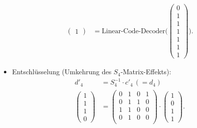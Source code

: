 \begin{itemize}
\begin{align*}
\begin{pmatrix}
                1
            \end{pmatrix}
            &=\text{Linear-Code-Decoder(}
            \begin{pmatrix}
                0\\
                1\\
                1\\
                1\\
                1\\
                1\\
                1
            \end{pmatrix}
            \text{)}
            .
        \end{align*}
    \item Entschlüsselung (Umkehrung des $S_4$-Matrix-Effekts):
        \begin{align*}
            d'_{4}&=S_{4}^{-1} \cdot c'_4 \,(= d_4)\\
            \begin{pmatrix}
                1\\
                1\\
                1\\
                0
            \end{pmatrix}
            &=
            \begin{pmatrix} %
                0 & 1 & 0 & 1\\
                0 & 1 & 1 & 0\\
                1 & 1 & 0 & 0\\
                0 & 1 & 0 & 0\\
            \end{pmatrix}
            \cdot
            \begin{pmatrix} %
                1\\
                0\\
                1\\
                1
            \end{pmatrix}
            .
        \end{align*}
\end{itemize}

